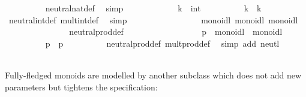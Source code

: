 \begin{isabellebody}
\ \ \ \ \ \ \ \ \isamarkupfalse%
\ neutral{\isacharunderscore}nat{\isacharunderscore}def\ \isamarkupfalse%
\ simp\isanewline
\ \ \ \ \isamarkupfalse%
\isanewline
\ \ \ \ \ \ \isamarkupfalse%
\ k\ {\isacharcolon}{\isacharcolon}\ int\isanewline
\ \ \ \ \ \ \isamarkupfalse%
\ {\isachardoublequoteopen}{\isasymone}\ {\isasymotimes}\ k\ {\isacharequal}\ k{\isachardoublequoteclose}\isanewline
\ \ \ \ \ \ \ \ \isamarkupfalse%
\ neutral{\isacharunderscore}int{\isacharunderscore}def\ mult{\isacharunderscore}int{\isacharunderscore}def\ \isamarkupfalse%
\ simp\isanewline
\ \ \ \ \isamarkupfalse%
%
\endisatagproof
{\isafoldproof}%
%
\isadelimproof
%
\endisadelimproof
\isanewline
\isanewline
\ \ \ \ \isamarkupfalse%
\isanewline
\isanewline
\ \ \ \ \isamarkupfalse%
\ {\isacharasterisk}\ {\isacharcolon}{\isacharcolon}\ {\isacharparenleft}monoidl{\isacharcomma}\ monoidl{\isacharparenright}\ monoidl\isanewline
\ \ \ \ \isanewline
\isanewline
\ \ \ \ \isamarkupfalse%
\isanewline
\ \ \ \ \ \ neutral{\isacharunderscore}prod{\isacharunderscore}def{\isacharcolon}\ {\isachardoublequoteopen}{\isasymone}\ {\isacharequal}\ {\isacharparenleft}{\isasymone}{\isacharcomma}\ {\isasymone}{\isacharparenright}{\isachardoublequoteclose}\isanewline
\isanewline
\ \ \ \ \isamarkupfalse%
%
\isadelimproof
\ %
\endisadelimproof
%
\isatagproof
{}\isamarkupfalse%
\isanewline
\ \ \ \ \ \ \isamarkupfalse%
\ p\ {\isacharcolon}{\isacharcolon}\ {\isachardoublequoteopen}{\isasymalpha}{\isasymColon}monoidl\ {\isasymtimes}\ {\isasymbeta}{\isasymColon}monoidl{\isachardoublequoteclose}\isanewline
\ \ \ \ \ \ \isamarkupfalse%
\ {\isachardoublequoteopen}{\isasymone}\ {\isasymotimes}\ p\ {\isacharequal}\ p{\isachardoublequoteclose}\isanewline
\ \ \ \ \ \ \ \ \isamarkupfalse%
\ neutral{\isacharunderscore}prod{\isacharunderscore}def\ mult{\isacharunderscore}prod{\isacharunderscore}def\ \isamarkupfalse%
\ {\isacharparenleft}simp\ add{\isacharcolon}\ neutl{\isacharparenright}\isanewline
\ \ \ \ \isamarkupfalse%
%
\endisatagproof
{\isafoldproof}%
%
\isadelimproof
%
\endisadelimproof
\isanewline
\isanewline
\ \ \ \isamarkupfalse%
%
\begin{isamarkuptext}%
\noindent Fully-fledged monoids are modelled by another subclass
  which does not add new parameters but tightens the specification:%

\end{isamarkuptext}
\end{isabellebody}
